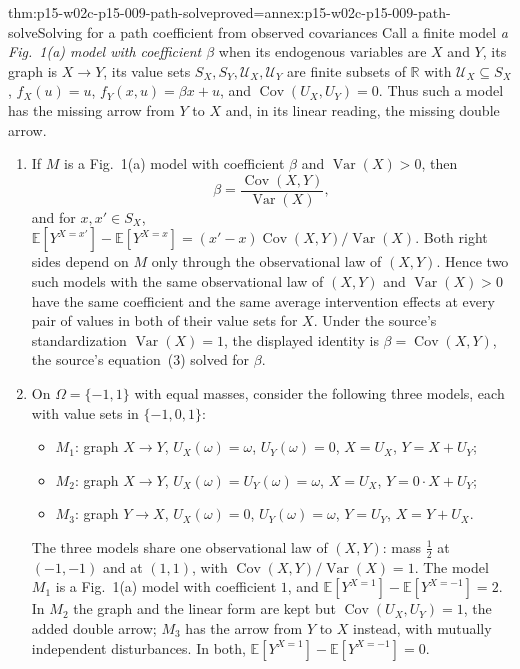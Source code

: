 \begin{hbtheorem}{thm:p15-w02c-p15-009-path-solve}{proved=annex:p15-w02c-p15-009-path-solve}{Solving for a path coefficient from observed covariances}
Call a finite model \emph{a Fig.~1(a) model with coefficient \(\beta\)}
when its endogenous variables are \(X\) and \(Y\), its graph is
\(X\to Y\), its value sets \(S_X,S_Y,\mathcal U_X,\mathcal U_Y\) are
finite subsets of \(\mathbb R\) with \(\mathcal U_X\subseteq S_X\),
\(f_X(u)=u\), \(f_Y(x,u)=\beta x+u\), and
\(\operatorname{Cov}(U_X,U_Y)=0\). Thus such a model has the missing
arrow from \(Y\) to \(X\) and, in its linear reading, the missing double
arrow.
\begin{enumerate}
\item If \(M\) is a Fig.~1(a) model with coefficient \(\beta\) and
      \(\operatorname{Var}(X)>0\), then
      \[
       \beta=\frac{\operatorname{Cov}(X,Y)}{\operatorname{Var}(X)},
      \]
      and for \(x,x'\in S_X\),
      \(\mathbb E[Y^{X=x'}]-\mathbb E[Y^{X=x}]
      =(x'-x)\operatorname{Cov}(X,Y)/\operatorname{Var}(X)\).
      Both right sides depend on \(M\) only through the observational law
      of \((X,Y)\). Hence two such models with the same observational law
      of \((X,Y)\) and \(\operatorname{Var}(X)>0\) have the same
      coefficient and the same average intervention effects at every
      pair of values in both of their value sets for \(X\). Under the
      source's standardization \(\operatorname{Var}(X)=1\), the
      displayed identity is \(\beta=\operatorname{Cov}(X,Y)\), the
      source's equation~(3) solved for \(\beta\).
\item On \(\Omega=\{-1,1\}\) with equal masses, consider the following
      three models, each with value sets in \(\{-1,0,1\}\):
      \begin{itemize}
      \item \(M_1\): graph \(X\to Y\), \(U_X(\omega)=\omega\),
            \(U_Y(\omega)=0\), \(X=U_X\), \(Y=X+U_Y\);
      \item \(M_2\): graph \(X\to Y\), \(U_X(\omega)=U_Y(\omega)=\omega\),
            \(X=U_X\), \(Y=0\cdot X+U_Y\);
      \item \(M_3\): graph \(Y\to X\), \(U_X(\omega)=0\),
            \(U_Y(\omega)=\omega\), \(Y=U_Y\), \(X=Y+U_X\).
      \end{itemize}
      The three models share one observational law of \((X,Y)\): mass
      \(\tfrac12\) at \((-1,-1)\) and at \((1,1)\), with
      \(\operatorname{Cov}(X,Y)/\operatorname{Var}(X)=1\). The model
      \(M_1\) is a Fig.~1(a) model with coefficient \(1\), and
      \(\mathbb E[Y^{X=1}]-\mathbb E[Y^{X=-1}]=2\). In \(M_2\) the
      graph and the linear form are kept but
      \(\operatorname{Cov}(U_X,U_Y)=1\), the added double arrow; \(M_3\)
      has the arrow from \(Y\) to \(X\) instead, with mutually
      independent disturbances. In both,
      \(\mathbb E[Y^{X=1}]-\mathbb E[Y^{X=-1}]=0\).
\end{enumerate}
\end{hbtheorem}

